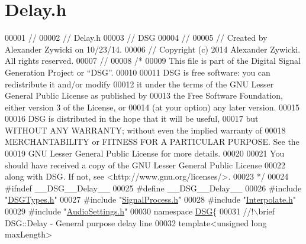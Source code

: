 \hypertarget{_delay_8h_source}{\section{Delay.\+h}
\label{_delay_8h_source}
}

\begin{DoxyCode}
00001 \textcolor{comment}{//}
00002 \textcolor{comment}{//  Delay.h}
00003 \textcolor{comment}{//  DSG}
00004 \textcolor{comment}{//}
00005 \textcolor{comment}{//  Created by Alexander Zywicki on 10/23/14.}
00006 \textcolor{comment}{//  Copyright (c) 2014 Alexander Zywicki. All rights reserved.}
00007 \textcolor{comment}{//}
00008 \textcolor{comment}{/*}
00009 \textcolor{comment}{ This file is part of the Digital Signal Generation Project or “DSG”.}
00010 \textcolor{comment}{}
00011 \textcolor{comment}{ DSG is free software: you can redistribute it and/or modify}
00012 \textcolor{comment}{ it under the terms of the GNU Lesser General Public License as published by}
00013 \textcolor{comment}{ the Free Software Foundation, either version 3 of the License, or}
00014 \textcolor{comment}{ (at your option) any later version.}
00015 \textcolor{comment}{}
00016 \textcolor{comment}{ DSG is distributed in the hope that it will be useful,}
00017 \textcolor{comment}{ but WITHOUT ANY WARRANTY; without even the implied warranty of}
00018 \textcolor{comment}{ MERCHANTABILITY or FITNESS FOR A PARTICULAR PURPOSE.  See the}
00019 \textcolor{comment}{ GNU Lesser General Public License for more details.}
00020 \textcolor{comment}{}
00021 \textcolor{comment}{ You should have received a copy of the GNU Lesser General Public License}
00022 \textcolor{comment}{ along with DSG.  If not, see <http://www.gnu.org/licenses/>.}
00023 \textcolor{comment}{ */}
00024 \textcolor{preprocessor}{#ifndef \_\_DSG\_\_Delay\_\_}
00025 \textcolor{preprocessor}{#define \_\_DSG\_\_Delay\_\_}
00026 \textcolor{preprocessor}{#include "\hyperlink{_d_s_g_types_8h}{DSGTypes.h}"}
00027 \textcolor{preprocessor}{#include "\hyperlink{_signal_process_8h}{SignalProcess.h}"}
00028 \textcolor{preprocessor}{#include "\hyperlink{_interpolate_8h}{Interpolate.h}"}
00029 \textcolor{preprocessor}{#include "\hyperlink{_audio_settings_8h}{AudioSettings.h}"}
00030 \textcolor{keyword}{namespace }\hyperlink{namespace_d_s_g}{DSG}\{\textcolor{comment}{}
00031 \textcolor{comment}{    //!\(\backslash\)brief DSG::Delay - General purpose delay line}
00032 \textcolor{comment}{}    \textcolor{keyword}{template}<\textcolor{keywordtype}{unsigned} \textcolor{keywordtype}{long} maxLength>

\end{DoxyCode}
